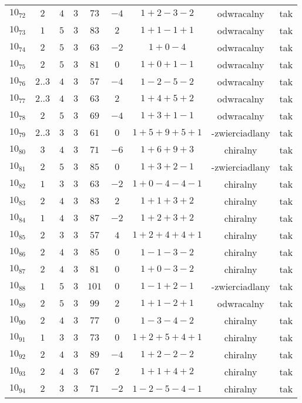 \begin{longtable}{ccccccccc}
$10_{72}$ & $2$ & $4$ & $3$ & $73$ & $-4$ & $1+2-3-2$ & odwracalny & tak \\
$10_{73}$ & $1$ & $5$ & $3$ & $83$ & $2$ & $1+1-1+1$ & odwracalny & tak \\
$10_{74}$ & $2$ & $5$ & $3$ & $63$ & $-2$ & $1+0-4$ & odwracalny & tak \\
$10_{75}$ & $2$ & $5$ & $3$ & $81$ & $0$ & $1+0+1-1$ & odwracalny & tak \\
$10_{76}$ & $2..3$ & $4$ & $3$ & $57$ & $-4$ & $1-2-5-2$ & odwracalny & tak \\
$10_{77}$ & $2..3$ & $4$ & $3$ & $63$ & $2$ & $1+4+5+2$ & odwracalny & tak \\
$10_{78}$ & $2$ & $5$ & $3$ & $69$ & $-4$ & $1+3+1-1$ & odwracalny & tak \\
$10_{79}$ & $2..3$ & $3$ & $3$ & $61$ & $0$ & $1+5+9+5+1$ & -zwierciadlany & tak \\
$10_{80}$ & $3$ & $4$ & $3$ & $71$ & $-6$ & $1+6+9+3$ & chiralny & tak \\
$10_{81}$ & $2$ & $5$ & $3$ & $85$ & $0$ & $1+3+2-1$ & -zwierciadlany & tak \\
$10_{82}$ & $1$ & $3$ & $3$ & $63$ & $-2$ & $1+0-4-4-1$ & chiralny & tak \\
$10_{83}$ & $2$ & $4$ & $3$ & $83$ & $2$ & $1+1+3+2$ & chiralny & tak \\
$10_{84}$ & $1$ & $4$ & $3$ & $87$ & $-2$ & $1+2+3+2$ & chiralny & tak \\
$10_{85}$ & $2$ & $3$ & $3$ & $57$ & $4$ & $1+2+4+4+1$ & chiralny & tak \\
$10_{86}$ & $2$ & $4$ & $3$ & $85$ & $0$ & $1-1-3-2$ & chiralny & tak \\
$10_{87}$ & $2$ & $4$ & $3$ & $81$ & $0$ & $1+0-3-2$ & chiralny & tak \\
$10_{88}$ & $1$ & $5$ & $3$ & $101$ & $0$ & $1-1+2-1$ & -zwierciadlany & tak \\
$10_{89}$ & $2$ & $5$ & $3$ & $99$ & $2$ & $1+1-2+1$ & odwracalny & tak \\
$10_{90}$ & $2$ & $4$ & $3$ & $77$ & $0$ & $1-3-4-2$ & chiralny & tak \\
$10_{91}$ & $1$ & $3$ & $3$ & $73$ & $0$ & $1+2+5+4+1$ & chiralny & tak \\
$10_{92}$ & $2$ & $4$ & $3$ & $89$ & $-4$ & $1+2-2-2$ & chiralny & tak \\
$10_{93}$ & $2$ & $4$ & $3$ & $67$ & $2$ & $1+1+4+2$ & chiralny & tak \\
$10_{94}$ & $2$ & $3$ & $3$ & $71$ & $-2$ & $1-2-5-4-1$ & chiralny & tak \\

\end{longtable}
